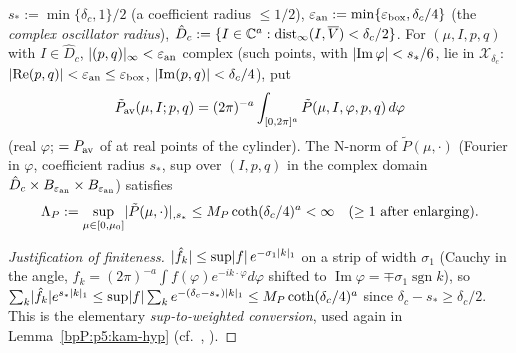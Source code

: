 \begin{definition}\label{bpP:p5:consts}
$s_*:=\min\{\delta_c,1\}/2$ (a coefficient radius $\le1/2$), $\varepsilon_{\rm an}:=\min\{\varepsilon_{\rm box},\delta_c/4\}$ (the \emph{complex oscillator radius}), $\hat D_c:=\{I\in\mathbb{C}^a:\operatorname{dist}_\infty(I,\overline V)<\delta_c/2\}$. For $(\mu,I,p,q)$ with $I\in\hat D_c$, $\lvert (p,q)\rvert_\infty<\varepsilon_{\rm an}$ complex (such points, with $\lvert \operatorname{Im}\varphi\rvert<s_*/6$, lie in $\mathcal X_{\delta_c}$: $\lvert \operatorname{Re}(p,q)\rvert<\varepsilon_{\rm an}\le\varepsilon_{\rm box}$, $\lvert \operatorname{Im}(p,q)\rvert<\delta_c/4$), put
\[\tilde P_{\rm av}(\mu,I;p,q)=(2\pi)^{-a}\int_{[0,2\pi]^a}\tilde P(\mu,I,\varphi,p,q)\,d\varphi\]
(real $\varphi$; $=P_{\rm av}$ of  at real points of the cylinder). The N-norm of $\tilde P(\mu,\cdot)$ (Fourier in $\varphi$, coefficient radius $s_*$, sup over $(I,p,q)$ in the complex domain $\hat D_c\times B_{\varepsilon_{\rm an}}\times B_{\varepsilon_{\rm an}}$) satisfies
\[\Lambda_P:=\sup_{\mu\in[0,\mu_0]}\wn{\tilde P(\mu,\cdot)}{}{s_*}\le M_P\coth(\delta_c/4)^a<\infty\quad(\ge1\ \text{after enlarging}).\]
\end{definition}
\begin{proof}[Justification of finiteness]
$\lvert \hat f_k\rvert\le\sup\lvert f\rvert\,e^{-\sigma_1\lvert k\rvert_1}$ on a strip of width $\sigma_1$ (Cauchy in the angle, $\hat f_k=(2\pi)^{-a}\int f(\varphi)e^{-ik\cdot\varphi}d\varphi$ shifted to $\operatorname{Im}\varphi=\mp\sigma_1\operatorname{sgn}k$), so $\sum_k\lvert \hat f_k\rvert e^{s_*\lvert k\rvert_1}\le\sup\lvert f\rvert\sum_ke^{-(\delta_c-s_*)\lvert k\rvert_1}\le M_P\coth(\delta_c/4)^a$ since $\delta_c-s_*\ge\delta_c/2$. This is the elementary \emph{sup-to-weighted conversion}, used again in Lemma~\ref{bpP:p5:kam-hyp} (cf.\ , ).
\end{proof}

